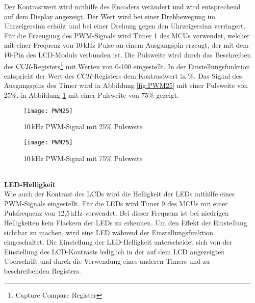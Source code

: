 Der Kontrastwert wird mithilfe des Encoders verändert und wird entsprechend auf dem Display angezeigt. Der Wert wird bei einer Drehbewegung im Uhrzeigersinn erhöht und bei einer Drehung gegen den Uhrzeigersinn verringert.\\
Für die Erzeugung des PWM-Signals wird Timer 1 des MCUs verwendet, welcher mit einer Frequenz von 10\,kHz Pulse an einem Ausgangspin erzeugt, der mit dem $V0$-Pin des LCD-Moduls verbunden ist. Die Pulsweite wird durch das Beschreiben des $CCR$-Registers\footnote{Capture Compare Register} mit Werten von 0-100 eingestellt. In der Einstellungsfunktion entspricht der Wert des $CCR$-Registers dem Kontrastwert in \%. Das Signal des Ausgangspins des Timer wird in Abbildung \ref{fig:PWM25} mit einer Pulsweite von 25\%, in Abbildung \ref{fig:PWM75} mit einer Pulsweite von 75\% gezeigt. 
\begin{figure}[h]
	\begin{minipage}{.48\linewidth}
		\centering
		\texttt{[image: PWM25]}
		\caption{10\,kHz PWM-Signal mit 25\% Pulsweite}
		\label{fig:PWM25}
	\end{minipage}
	\hfill
	\begin{minipage}{.48\linewidth}
		\centering
		\texttt{[image: PWM75]}
		\caption{10\,kHz PWM-Signal mit 75\% Pulsweite}
		\label{fig:PWM75}
	\end{minipage}
\end{figure}
\\
\newline
\textbf{LED-Helligkeit}\\
Wie auch der Kontrast des LCDs wird die Helligkeit der LEDs mithilfe eines PWM-Signals eingestellt. Für die LEDs wird Timer 9 des MCUs mit einer Pulsfrequenz von 12,5\,kHz verwendet. Bei dieser Frequenz ist bei niedrigen Helligkeiten kein Flackern der LEDs zu erkennen. Um den Effekt der Einstellung sichtbar zu machen, wird eine LED während der Einstellungsfunktion eingeschaltet. Die Einstellung der LED-Helligkeit unterscheidet sich von der Einstellung des LCD-Kontrasts lediglich in der auf dem LCD angezeigten Überschrift und durch die Verwendung eines anderen Timers und zu beschreibenden Registers.
